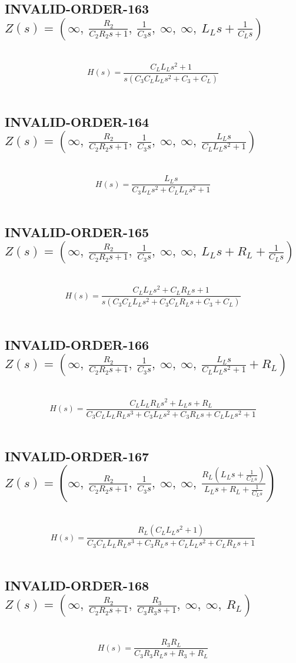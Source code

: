 \documentclass{article}
\begin{document}
\subsection{INVALID-ORDER-163 $Z(s) = \left( \infty, \  \frac{R_{2}}{C_{2} R_{2} s + 1}, \  \frac{1}{C_{3} s}, \  \infty, \  \infty, \  L_{L} s + \frac{1}{C_{L} s}\right)$ } \ 
\textbf{\[H(s) = \frac{C_{L} L_{L} s^{2} + 1}{s \left(C_{3} C_{L} L_{L} s^{2} + C_{3} + C_{L}\right)}\] } \ 
\subsection{INVALID-ORDER-164 $Z(s) = \left( \infty, \  \frac{R_{2}}{C_{2} R_{2} s + 1}, \  \frac{1}{C_{3} s}, \  \infty, \  \infty, \  \frac{L_{L} s}{C_{L} L_{L} s^{2} + 1}\right)$ } \ 
\textbf{\[H(s) = \frac{L_{L} s}{C_{3} L_{L} s^{2} + C_{L} L_{L} s^{2} + 1}\] } \ 
\subsection{INVALID-ORDER-165 $Z(s) = \left( \infty, \  \frac{R_{2}}{C_{2} R_{2} s + 1}, \  \frac{1}{C_{3} s}, \  \infty, \  \infty, \  L_{L} s + R_{L} + \frac{1}{C_{L} s}\right)$ } \ 
\textbf{\[H(s) = \frac{C_{L} L_{L} s^{2} + C_{L} R_{L} s + 1}{s \left(C_{3} C_{L} L_{L} s^{2} + C_{3} C_{L} R_{L} s + C_{3} + C_{L}\right)}\] } \ 
\subsection{INVALID-ORDER-166 $Z(s) = \left( \infty, \  \frac{R_{2}}{C_{2} R_{2} s + 1}, \  \frac{1}{C_{3} s}, \  \infty, \  \infty, \  \frac{L_{L} s}{C_{L} L_{L} s^{2} + 1} + R_{L}\right)$ } \ 
\textbf{\[H(s) = \frac{C_{L} L_{L} R_{L} s^{2} + L_{L} s + R_{L}}{C_{3} C_{L} L_{L} R_{L} s^{3} + C_{3} L_{L} s^{2} + C_{3} R_{L} s + C_{L} L_{L} s^{2} + 1}\] } \ 
\subsection{INVALID-ORDER-167 $Z(s) = \left( \infty, \  \frac{R_{2}}{C_{2} R_{2} s + 1}, \  \frac{1}{C_{3} s}, \  \infty, \  \infty, \  \frac{R_{L} \left(L_{L} s + \frac{1}{C_{L} s}\right)}{L_{L} s + R_{L} + \frac{1}{C_{L} s}}\right)$ } \ 
\textbf{\[H(s) = \frac{R_{L} \left(C_{L} L_{L} s^{2} + 1\right)}{C_{3} C_{L} L_{L} R_{L} s^{3} + C_{3} R_{L} s + C_{L} L_{L} s^{2} + C_{L} R_{L} s + 1}\] } \ 
\subsection{INVALID-ORDER-168 $Z(s) = \left( \infty, \  \frac{R_{2}}{C_{2} R_{2} s + 1}, \  \frac{R_{3}}{C_{3} R_{3} s + 1}, \  \infty, \  \infty, \  R_{L}\right)$ } \ 
\textbf{\[H(s) = \frac{R_{3} R_{L}}{C_{3} R_{3} R_{L} s + R_{3} + R_{L}}\] } \ 
\end{document}
